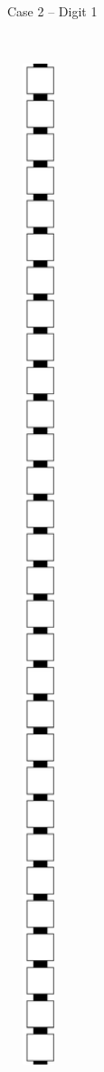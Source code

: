 \begin{enumerate}[label={--}]
\begin{figure}[H]
\begin{subfigure}[t]{0.2\textwidth}
                        \caption{\label{fig:warping/pre_warp_case2_digit1_msr} Case 2 -- Digit 1}
                    \end{subfigure}%
                    ~
                    \begin{subfigure}[t]{0.2\textwidth}
                        \centering
                        \includegraphics[width=0.2\textwidth]{warping/pre_warp_case2_digit2_msr}

\end{subfigure}
\end{figure}
\end{enumerate}
